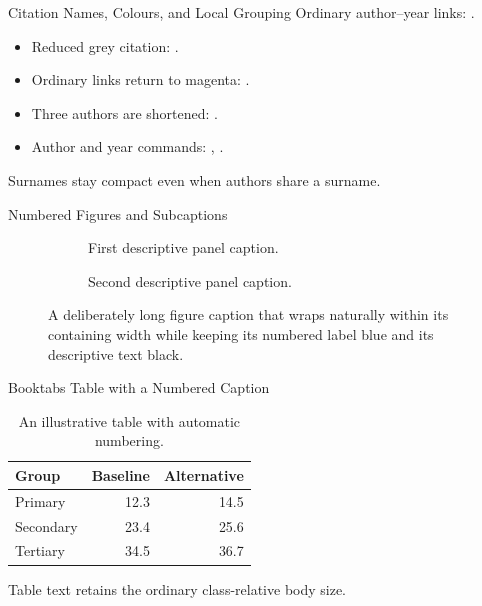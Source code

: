 \documentclass[\DesignTestOptions,xcolor={svgnames}]{beamer}
\begin{document}
\begin{frame}{Citation Names, Colours, and Local Grouping}
  Ordinary author--year links: \textcite{smith2020,smith2021}.
  \begin{itemize}
    \item Reduced grey citation: .
    \item Ordinary links return to magenta: \citep{smith2021}.
    \item Three authors are shortened: \citet{adams2022}.
    \item Author and year commands: \citeauthor{smith2020},
      \citeyearpar{smith2020}.
  \end{itemize}
  Surnames stay compact even when authors share a surname.
\end{frame}

\begin{frame}{Numbered Figures and Subcaptions}
  \begin{figure}
    \centering
    \begin{subfigure}{0.45\linewidth}
      \centering{}
      \caption{First descriptive panel caption.}
    \end{subfigure}\hfill
    \begin{subfigure}{0.45\linewidth}
      \centering{}
      \caption{Second descriptive panel caption.}
    \end{subfigure}
    \caption{A deliberately long figure caption that wraps naturally within
      its containing width while keeping its numbered label blue and its
      descriptive text black.}\label{fig:panels}
  \end{figure}
\end{frame}

\begin{frame}{Booktabs Table with a Numbered Caption}
  \begin{table}
    \caption{An illustrative table with automatic numbering.}\label{tab:sample}
    \centering
    \begin{tabular}{lrr}
      \toprule
      Group & Baseline & Alternative \\
      \midrule
      Primary & 12.3 & 14.5 \\
      Secondary & 23.4 & 25.6 \\
      Tertiary & 34.5 & 36.7 \\
      \bottomrule
    \end{tabular}
  \end{table}
  Table text retains the ordinary class-relative body size.
\end{frame}
\end{document}
